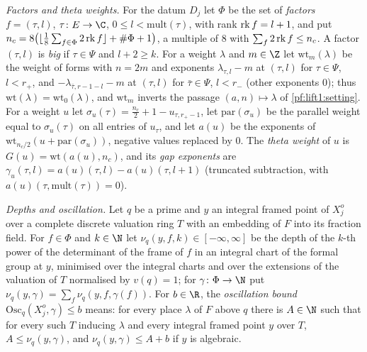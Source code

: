 \emph{Factors and theta weights.} For the datum $D_j$ let $\Phi$ be the set of \emph{factors}
$f=(\tau,l)$, $\tau\colon E\to\C$, $0\le l<\mathrm{mult}(\tau)$, with rank $\operatorname{rk} f=l+1$, and put
$n_c=8\bigl(\lfloor\frac18\sum_{f\in\Phi}2\operatorname{rk} f\rfloor+\#\Phi+1\bigr)$, a multiple of $8$ with
$\sum_f2\operatorname{rk} f\le n_c$. A factor $(\tau,l)$ is \emph{big} if $\tau\in\Psi$ and $l+2\ge k$. For a
weight $\lambda$ and $m\in\Z$ let $\mathrm{wt}_m(\lambda)$ be the weight of forms with $n=2m$ and
exponents $\lambda_{\tau,l}-m$ at $(\tau,l)$ for $\tau\in\Psi$, $l<r_+$, and
$-\lambda_{\bar\tau,r-1-l}-m$ at $(\tau,l)$ for $\bar\tau\in\Psi$, $l<r_-$ (other exponents $0$); thus
$\mathrm{wt}(\lambda)=\mathrm{wt}_0(\lambda)$, and $\mathrm{wt}_m$ inverts the passage
$(a,n)\mapsto\lambda$ of \cref{pf:lift1:setting}. For a weight $u$ let
$\sigma_u(\tau)=\frac{n_c}2+1-u_{\tau,r_+-1}$, let $\mathrm{par}(\sigma_u)$ be the parallel weight equal
to $\sigma_u(\tau)$ on all entries of $u_\tau$, and let $a(u)$ be the exponents of
$\mathrm{wt}_{n_c/2}(u+\mathrm{par}(\sigma_u))$, negative values replaced by $0$. The \emph{theta
weight} of $u$ is $G(u)=\mathrm{wt}(a(u),n_c)$, and its \emph{gap exponents} are
$\gamma_u(\tau,l)=a(u)(\tau,l)-a(u)(\tau,l+1)$ (truncated subtraction, with $a(u)(\tau,\mathrm{mult}(\tau))=0$).

\emph{Depths and oscillation.} Let $q$ be a prime and $y$ an integral framed point of $X^o_j$ over a
complete discrete valuation ring $T$ with an embedding of $F$ into its fraction field. For $f\in\Phi$
and $k\in\N$ let $\nu_q(y,f,k)\in[-\infty,\infty]$ be the depth of the $k$-th power of the determinant of
the frame of $f$ in an integral chart of the formal group at $y$, minimised over the integral charts and
over the extensions of the valuation of $T$ normalised by $v(q)=1$; for $\gamma\colon\Phi\to\N$ put
$\nu_q(y,\gamma)=\sum_f\nu_q(y,f,\gamma(f))$. For $b\in\R$, the \emph{oscillation bound}
$\mathrm{Osc}_q(X^o_j,\gamma)\le b$ means: for every place $\lambda$ of $F$ above $q$ there is $A\in\N$ such
that for every such $T$ inducing $\lambda$ and every integral framed point $y$ over $T$,
$A\le\nu_q(y,\gamma)$, and $\nu_q(y,\gamma)\le A+b$ if $y$ is algebraic.

